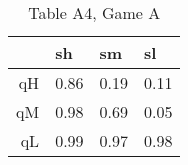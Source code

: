 \begin{table}[ht]
\centering
\begin{tabular}{rlll}
  \hline
 & sh & sm & sl \\ 
  \hline
qH & 0.86 & 0.19 & 0.11 \\ 
  qM & 0.98 & 0.69 & 0.05 \\ 
  qL & 0.99 & 0.97 & 0.98 \\ 
   \hline
\end{tabular}
\caption{Table A4, Game A} 
\end{table}

